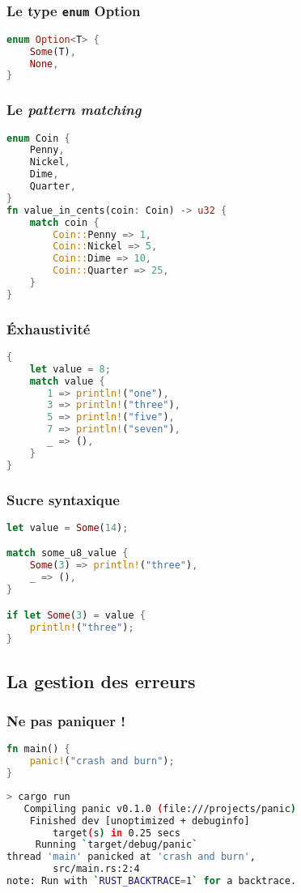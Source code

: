 \begin{frame}[fragile]
  \frametitle{Le type \texttt{enum} Option}
  \begin{lstlisting}[language=rust]
enum Option<T> {
    Some(T),
    None,
}
  \end{lstlisting}
\end{frame}

\begin{frame}[fragile]
  \frametitle{Le \textit{pattern matching}}
  \begin{lstlisting}[language=rust, basicstyle=\small{}]
enum Coin {
    Penny,
    Nickel,
    Dime,
    Quarter,
}
fn value_in_cents(coin: Coin) -> u32 {
    match coin {
        Coin::Penny => 1,
        Coin::Nickel => 5,
        Coin::Dime => 10,
        Coin::Quarter => 25,
    }
}
  \end{lstlisting}
\end{frame}

\begin{frame}[fragile]
  \frametitle{Éxhaustivité}
  \begin{lstlisting}[language=rust]
{
    let value = 8;
    match value {
       1 => println!("one"),
       3 => println!("three"),
       5 => println!("five"),
       7 => println!("seven"),
       _ => (),
    }
}
  \end{lstlisting}
\end{frame}


\begin{frame}[fragile]
  \frametitle{Sucre syntaxique}
  \begin{lstlisting}[language=rust]
let value = Some(14);

match some_u8_value {
    Some(3) => println!("three"),
    _ => (),
}

if let Some(3) = value {
    println!("three");
}
  \end{lstlisting}
\end{frame}

\subsection{La gestion des erreurs}

\begin{frame}[fragile]
  \frametitle{Ne pas paniquer !}
  \begin{lstlisting}[language=rust]
fn main() {
    panic!("crash and burn");
}
  \end{lstlisting}
  \begin{lstlisting}[language=bash, basicstyle=\small{}]
> cargo run
   Compiling panic v0.1.0 (file:///projects/panic)
    Finished dev [unoptimized + debuginfo]
        target(s) in 0.25 secs
     Running `target/debug/panic`
thread 'main' panicked at 'crash and burn',
        src/main.rs:2:4
note: Run with `RUST_BACKTRACE=1` for a backtrace.
  \end{lstlisting}
\end{frame}

